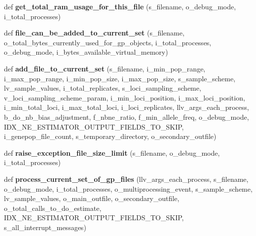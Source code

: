 \begin{DoxyCompactItemize}
\item 
def {\bfseries get\+\_\+total\+\_\+ram\+\_\+usage\+\_\+for\+\_\+this\+\_\+file} (s\+\_\+filename, o\+\_\+debug\+\_\+mode, i\+\_\+total\+\_\+processes)\hypertarget{namespacenegui_1_1pgdriveneestimator_ae85cd0fbf1a18d081c098a7f31a340d2}{}\label{namespacenegui_1_1pgdriveneestimator_ae85cd0fbf1a18d081c098a7f31a340d2}

\item 
def {\bfseries file\+\_\+can\+\_\+be\+\_\+added\+\_\+to\+\_\+current\+\_\+set} (s\+\_\+filename, o\+\_\+total\+\_\+bytes\+\_\+currently\+\_\+used\+\_\+for\+\_\+gp\+\_\+objects, i\+\_\+total\+\_\+processes, o\+\_\+debug\+\_\+mode, i\+\_\+bytes\+\_\+available\+\_\+virtual\+\_\+memory)\hypertarget{namespacenegui_1_1pgdriveneestimator_ac52a11ee572f6b104b8b2af3076b6479}{}\label{namespacenegui_1_1pgdriveneestimator_ac52a11ee572f6b104b8b2af3076b6479}

\item 
def {\bfseries add\+\_\+file\+\_\+to\+\_\+current\+\_\+set} (s\+\_\+filename, i\+\_\+min\+\_\+pop\+\_\+range, i\+\_\+max\+\_\+pop\+\_\+range, i\+\_\+min\+\_\+pop\+\_\+size, i\+\_\+max\+\_\+pop\+\_\+size, s\+\_\+sample\+\_\+scheme, lv\+\_\+sample\+\_\+values, i\+\_\+total\+\_\+replicates, s\+\_\+loci\+\_\+sampling\+\_\+scheme, v\+\_\+loci\+\_\+sampling\+\_\+scheme\+\_\+param, i\+\_\+min\+\_\+loci\+\_\+position, i\+\_\+max\+\_\+loci\+\_\+position, i\+\_\+min\+\_\+total\+\_\+loci, i\+\_\+max\+\_\+total\+\_\+loci, i\+\_\+loci\+\_\+replicates, llv\+\_\+args\+\_\+each\+\_\+process, b\+\_\+do\+\_\+nb\+\_\+bias\+\_\+adjustment, f\+\_\+nbne\+\_\+ratio, f\+\_\+min\+\_\+allele\+\_\+freq, o\+\_\+debug\+\_\+mode, I\+D\+X\+\_\+\+N\+E\+\_\+\+E\+S\+T\+I\+M\+A\+T\+O\+R\+\_\+\+O\+U\+T\+P\+U\+T\+\_\+\+F\+I\+E\+L\+D\+S\+\_\+\+T\+O\+\_\+\+S\+K\+IP, i\+\_\+genepop\+\_\+file\+\_\+count, s\+\_\+temporary\+\_\+directory, o\+\_\+secondary\+\_\+outfile)\hypertarget{namespacenegui_1_1pgdriveneestimator_ae45071494b5c39165cac87c992d6e5cd}{}\label{namespacenegui_1_1pgdriveneestimator_ae45071494b5c39165cac87c992d6e5cd}

\item 
def {\bfseries raise\+\_\+exception\+\_\+file\+\_\+size\+\_\+limit} (s\+\_\+filename, o\+\_\+debug\+\_\+mode, i\+\_\+total\+\_\+processes)\hypertarget{namespacenegui_1_1pgdriveneestimator_a4a2864d554435ebb337c4c519511d93e}{}\label{namespacenegui_1_1pgdriveneestimator_a4a2864d554435ebb337c4c519511d93e}

\item 
def {\bfseries process\+\_\+current\+\_\+set\+\_\+of\+\_\+gp\+\_\+files} (llv\+\_\+args\+\_\+each\+\_\+process, s\+\_\+filename, o\+\_\+debug\+\_\+mode, i\+\_\+total\+\_\+processes, o\+\_\+multiprocessing\+\_\+event, s\+\_\+sample\+\_\+scheme, lv\+\_\+sample\+\_\+values, o\+\_\+main\+\_\+outfile, o\+\_\+secondary\+\_\+outfile, o\+\_\+total\+\_\+calls\+\_\+to\+\_\+do\+\_\+estimate, I\+D\+X\+\_\+\+N\+E\+\_\+\+E\+S\+T\+I\+M\+A\+T\+O\+R\+\_\+\+O\+U\+T\+P\+U\+T\+\_\+\+F\+I\+E\+L\+D\+S\+\_\+\+T\+O\+\_\+\+S\+K\+IP, s\+\_\+all\+\_\+interrupt\+\_\+messages)\hypertarget{namespacenegui_1_1pgdriveneestimator_a6abd32b781a8d2d442ae8b140b6b2c30}{}\label{namespacenegui_1_1pgdriveneestimator_a6abd32b781a8d2d442ae8b140b6b2c30}


\end{DoxyCompactItemize}
